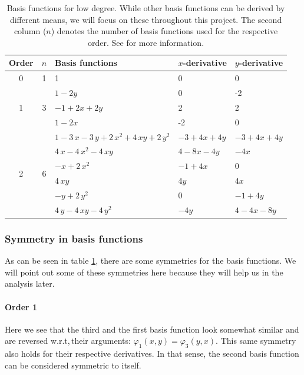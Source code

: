\documentclass[a4paper, twoside]{article}
\renewcommand{\phi}{\varphi}
\begin{document}
\begin{table}[ht]
  \centering
  \begin{tabular}{cclll}
    \toprule
    Order & $n$ & Basis functions & $x$-derivative & $y$-derivative \\
    \midrule
    \multirow{1}{*}{0} & 1 & 1 & 0 & 0\\
    \midrule
    \multirow{3}{*}{1} & \multirow{3}{*}{3} & $1-2y$ & 0 & -2\\
    &  & $-1+2x+2y$ & 2 & 2\\
    &  & $1-2x$ & -2 & 0\\
    \midrule
    \multirow{6}{*}{2} & \multirow{6}{*}{6} & $1-3\,x-3\,y+2\,{x}^{2}+4\,xy+2\,{y}^{2}$ & $-3+4x+4y$ & $-3+4x+4y$\\
& & $4\,x-4\,{x}^{2}-4\,xy$ & $4-8x-4y$ & $-4x$\\
& & $-x+2\,{x}^{2}$ & $-1+4x$ & 0\\
& & $4\,xy$ & $4y$ & $4x$\\
& & $-y+2\,{y}^{2}$ & $0$ & $-1+4y$\\
& & $4\,y-4\,xy-4\,{y}^{2}$ & $-4y$ & $4-4x-8y$ \\
    \bottomrule
  \end{tabular}
  \caption{Basis functions for low degree. While other basis functions can be derived by different means, we will focus on these throughout this project. The second column ($n$) denotes the number of basis functions used for the respective order. See \cite{castro07high-order-ader-fv-dg-numerical-methods,dunavant1985high} for more information.}
  \label{tab:basis-functions-for-low-degrees}
\end{table}

\subsubsection{Symmetry in basis functions}
\label{sec:basis-function-symmetry}

As can be seen in table \ref{tab:basis-functions-for-low-degrees}, there are some symmetries for the basis functions. We will point out some of these symmetries here because they will help us in the analysis later.

\paragraph{Order 1}

Here we see that the third and the first basis function look somewhat similar and are reversed w.r.t,\,their arguments: $\phi_1(x,y)=\phi_3(y,x)$. This same symmetry also holds for their respective derivatives. In that sense, the second basis function can be considered symmetric to itself.
\end{document}
